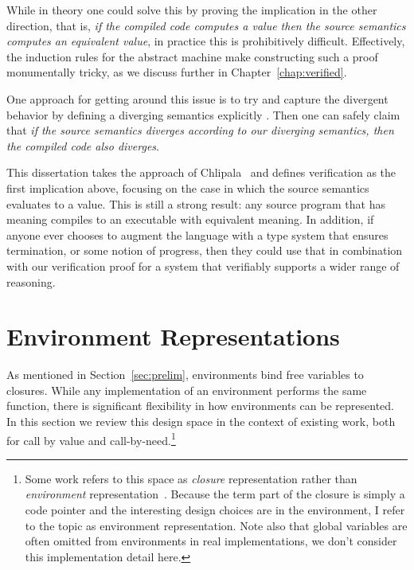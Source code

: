 While in theory one could solve this by proving the implication in the other
direction, that is, \emph{if the compiled code computes a value then the source
semantics computes an equivalent value}, in practice this is prohibitively
difficult. Effectively, the induction rules for the abstract machine make
constructing such a proof monumentally tricky, as we discuss further in
Chapter~\ref{chap:verified}.

One approach for getting around this issue is to try and capture the divergent
behavior by defining a diverging semantics explicitly \cite{functionalbigstep}.
Then one can safely claim that \emph{if the source semantics diverges according to
our diverging semantics, then the compiled code also diverges}. 

This dissertation takes the approach of Chlipala~\cite{chlipala2007certified}
and defines verification as the first implication above, focusing on the case in
which the source semantics evaluates to a value. This is still a strong
result: any source program that has meaning compiles to an executable with
equivalent meaning. In addition, if anyone ever chooses to augment the language
with a type system that ensures termination, or some notion of progress, then
they could use that in combination with our verification proof for a system that
verifiably supports a wider range of reasoning.

\section{Environment Representations} \label{sec:env}

As mentioned in Section~\ref{sec:prelim}, environments bind free variables to
closures. While any implementation of an environment performs the same function,
there is significant flexibility in how environments can be represented. In this
section we review this design space in the context of existing work, both for
call by value and call-by-need.\footnote{Some work refers to this space as
\emph{closure} representation rather than \emph{environment}
representation~\cite{shao1994space,appel1988optimizing}.  Because the term part
of the closure is simply a code pointer and the interesting design choices are
in the environment, I refer to the topic as environment representation. Note
also that global variables are often omitted from environments in real
implementations, we don't consider this implementation detail here.}

